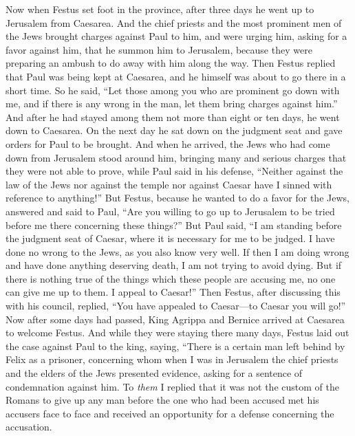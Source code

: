 \begin{biblechapter} %
 Now when Festus set foot in the province, after three days he went up to Jerusalem from Caesarea.
\verse And the chief priests and the most prominent men of the Jews brought charges against Paul to him, and were urging him,
\verse asking for a favor against him, that he summon him to Jerusalem, because they were preparing an ambush to do away with him along the way.
\verse Then Festus replied that Paul was being kept at Caesarea, and he himself was about to go there in a short time.
\verse So he said, “Let those among you who are prominent go down with me, and if there is any wrong in the man, let them bring charges against him.”
\verse And after he had stayed among them not more than eight or ten days, he went down to Caesarea. On the next day he sat down on the judgment seat and gave orders for Paul to be brought.
\verse And when he arrived, the Jews who had come down from Jerusalem stood around him, bringing many and serious charges that they were not able to prove,
\verse while Paul said in his defense, “Neither against the law of the Jews nor against the temple nor against Caesar have I sinned with reference to anything!”
\verse But Festus, because he wanted to do a favor for the Jews, answered and said to Paul, “Are you willing to go up to Jerusalem to be tried before me there concerning these things?”
\verse But Paul said, “I am standing before the judgment seat of Caesar, where it is necessary for me to be judged. I have done no wrong to the Jews, as you also know very well.
\verse If then I am doing wrong and have done anything deserving death, I am not trying to avoid dying. But if there is nothing true of the things which these people are accusing me, no one can give me up to them. I appeal to Caesar!”
\verse Then Festus, after discussing this with his council, replied, “You have appealed to Caesar—to Caesar you will go!”
 Now after some days had passed, King Agrippa and Bernice arrived at Caesarea to welcome Festus.
\verse And while they were staying there many days, Festus laid out the case against Paul to the king, saying, “There is a certain man left behind by Felix as a prisoner,
\verse concerning whom when I was in Jerusalem the chief priests and the elders of the Jews presented evidence, asking for a sentence of condemnation against him.
\verse To \textit{them} I replied that it was not the custom of the Romans to give up any man before the one who had been accused met his accusers face to face and received an opportunity for a defense concerning the accusation.

\end{biblechapter}
